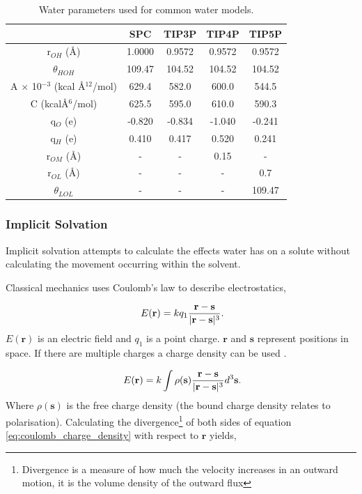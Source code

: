 \begin{center}
\begin{table}[ht]
{
\caption{Water parameters used for common water models.}
\hfill{}
\begin{tabular}{c | c | c | c | c}
\hline 
 & SPC \cite{SPC} & TIP3P \cite{tip4p} & TIP4P \cite{tip4p} & TIP5P \cite{tip5p} \\
\hline
r$_{OH}$ (\AA{}) & 1.0000 & 0.9572 & 0.9572 & 0.9572 \\
\hline 
$\theta_{HOH}$ & 109.47 & 104.52 & 104.52 & 104.52 \\
\hline
A $\times$ 10$^{-3}$ (kcal \AA{}$^{12}$/mol) & 629.4 & 582.0 & 600.0 & 544.5 \\
\hline
C (kcal\AA{}$^{6}$/mol) & 625.5 & 595.0 & 610.0 & 590.3 \\
\hline
q$_{O}$ (e) & -0.820 & -0.834 & -1.040 & -0.241 \\
\hline 
q$_{H}$ (e) & 0.410 & 0.417 & 0.520 & 0.241 \\
\hline
r$_{OM}$ (\AA{}) & - & - & 0.15 & - \\
\hline
r$_{OL}$ (\AA{}) & - & - & - & 0.7 \\
\hline
$\theta_{LOL}$ & - & - & - & 109.47 \\
\hline
\end{tabular}}
\hfill{}
\label{table:water_parameters}
\end{table}
\end{center}


\subsubsection{Implicit Solvation}

Implicit solvation attempts to calculate the effects water has on a solute without calculating the movement occurring within the solvent.

Classical mechanics uses Coulomb's law to describe electrostatics,

\begin{equation}
\ E(\mathbf{r} )=k q_1 \frac{\mathbf{r} - \mathbf{s}}{\vert \mathbf{r} - \mathbf{s} \vert^3} \\.
\end{equation}
%
$E(\mathbf{r})$ is an electric field and $q_1$ is a point charge. $\mathbf{r}$ and $\mathbf{s}$ represent positions in space.  If there are multiple charges a charge density can be used \cite{classical_electrodynamics_book}.

\begin{equation} \label{eq:coulomb_charge_density}
\ E(\mathbf{r} )=k \int \rho(\mathbf{s}) \frac{\mathbf{r} - \mathbf{s}}{\vert \mathbf{r} - \mathbf{s} \vert^3} d^3 \mathbf{s} \\.
\end{equation}
%
Where $\rho(\mathbf{s})$ is the free charge density (the bound charge density relates to polarisation).  Calculating the divergence\footnote{Divergence is a measure of how much the velocity increases in an outward motion, it is the volume density of the outward flux} of both sides of equation \ref{eq:coulomb_charge_density} with respect to $\mathbf{r}$ yields,

